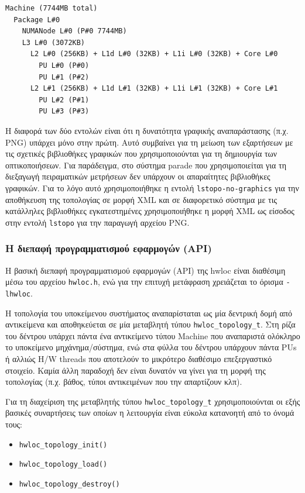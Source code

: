 \begin{verbatim}
Machine (7744MB total)
  Package L#0
    NUMANode L#0 (P#0 7744MB)
    L3 L#0 (3072KB)
      L2 L#0 (256KB) + L1d L#0 (32KB) + L1i L#0 (32KB) + Core L#0
        PU L#0 (P#0)
        PU L#1 (P#2)
      L2 L#1 (256KB) + L1d L#1 (32KB) + L1i L#1 (32KB) + Core L#1
        PU L#2 (P#1)
        PU L#3 (P#3)
\end{verbatim}

Η διαφορά των δύο εντολών είναι ότι η δυνατότητα γραφικής αναπαράστασης (π.χ. PNG) υπάρχει μόνο στην πρώτη. Αυτό συμβαίνει για τη μείωση των εξαρτήσεων με τις σχετικές βιβλιοθήκες γραφικών που χρησιμοποιούνται για τη δημιουργία των οπτικοποιήσεων. Για παράδειγμα, στο σύστημα parade που χρησιμοποιείται για τη διεξαγωγή πειραματικών μετρήσεων δεν υπάρχουν οι απαραίτητες βιβλιοθήκες γραφικών. Για το λόγο αυτό χρησιμοποιήθηκε η εντολή \texttt{lstopo-no-graphics} για την αποθήκευση της τοπολογίας σε μορφή XML και σε διαφορετικό σύστημα με τις κατάλληλες βιβλιοθήκες εγκατεστημένες χρησιμοποιήθηκε η μορφή XML ως είσοδος στην εντολή \texttt{lstopo} για την παραγωγή αρχείου PNG.


\subsubsection{Η διεπαφή προγραμματισμού εφαρμογών (API)}
Η βασική διεπαφή προγραμματισμού εφαρμογών (API) της hwloc είναι διαθέσιμη μέσω του αρχείου \texttt{hwloc.h}, ενώ για την επιτυχή μετάφραση χρειάζεται το όρισμα \texttt{-lhwloc}.

Η τοπολογία του υποκείμενου συστήματος αναπαρίσταται ως μία δεντρική δομή από αντικείμενα και αποθηκεύεται σε μία μεταβλητή τύπου \texttt{hwloc\_topology\_t}. Στη ρίζα του δέντρου υπάρχει πάντα ένα αντικείμενο τύπου Machine που αναπαριστά ολόκληρο το υποκείμενο μηχάνημα/σύστημα, ενώ στα φύλλα του δέντρου υπάρχουν πάντα PUs ή αλλιώς H/W threads που αποτελούν το μικρότερο διαθέσιμο επεξεργαστικό στοιχείο. Καμία άλλη παραδοχή δεν είναι δυνατόν να γίνει για τη μορφή της τοπολογίας (π.χ. βάθος, τύποι αντικειμένων που την απαρτίζουν κλπ).

Για τη διαχείριση της μεταβλητής τύπου \texttt{hwloc\_topology\_t} χρησιμοποιούνται οι εξής βασικές συναρτήσεις των οποίων η λειτουργία είναι εύκολα κατανοητή από το όνομά τους:
\begin{itemize}
	\item \texttt{hwloc\_topology\_init()}
	\item \texttt{hwloc\_topology\_load()}
	\item \texttt{hwloc\_topology\_destroy()}
\end{itemize}


